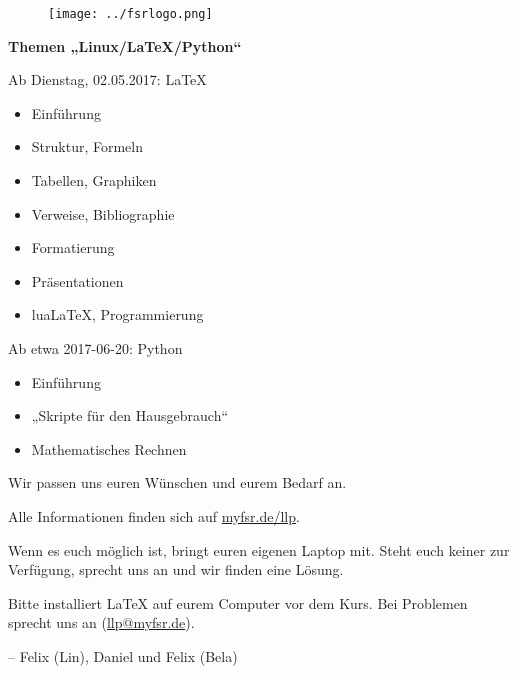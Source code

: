 \documentclass[12pt]{scrartcl}
\newcommand{\chsep}{-2ex}
\begin{document}
  \centering
  \begin{figure}[t]
    \flushright
    \texttt{[image: ../fsrlogo.png]}
  \end{figure}
  {\Huge \textbf{
  Themen „Linux/\LaTeX/Python“}}
  \vspace{0.5cm}

  {\Large Ab Dienstag, 02.05.2017: \LaTeX
  \begin{itemize}%
    \item Einführung
       \item Struktur, Formeln
       \item Tabellen, Graphiken
       \item Verweise, Bibliographie
    \item Formatierung
    \item Präsentationen
    \item lua\LaTeX, Programmierung
  \end{itemize}
  Ab etwa 2017-06-20: Python
  \begin{itemize}%
    \item Einführung
    \item „Skripte für den Hausgebrauch“
    \item Mathematisches Rechnen
  \end{itemize}
  Wir passen uns euren Wünschen und eurem Bedarf an.

  Alle Informationen finden sich auf \url{myfsr.de/llp}.

  Wenn es euch möglich ist, bringt euren eigenen Laptop mit. Steht euch
keiner zur Verfügung, sprecht uns an und wir finden eine Lösung.

  Bitte installiert \LaTeX{} auf eurem Computer vor dem Kurs. Bei Problemen sprecht uns an (\url{llp@myfsr.de}).}

  \vspace{2ex}
  
  -- Felix (Lin), Daniel und Felix (Bela)
\end{document}
